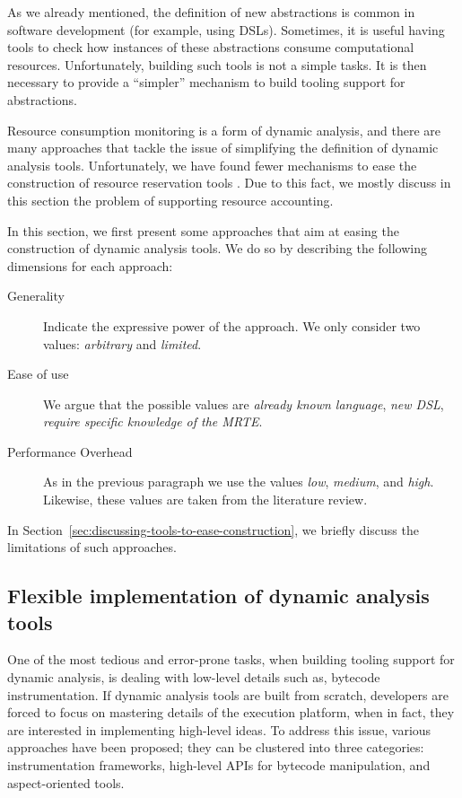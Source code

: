 As we already mentioned, the definition of new abstractions is common in software development (for example, using DSLs).
Sometimes, it is useful having tools to check how instances of these abstractions consume computational resources.
Unfortunately, building such tools is not a simple tasks.
It is then necessary to provide a ``simpler'' mechanism to build tooling support for abstractions.

Resource consumption monitoring is a form of dynamic analysis, and there are many approaches that tackle the issue of simplifying the definition of dynamic analysis tools.
Unfortunately, we have found fewer mechanisms to ease the construction of resource reservation tools \cite{mueller}.
Due to this fact, we mostly discuss in this section the problem of supporting resource accounting. 

In this section, we first present some approaches that aim at easing the construction of dynamic analysis tools.
We do so by describing the following dimensions for each approach:

\begin{description}
\item[Generality] Indicate the expressive power of the approach. We only consider two values: \textit{arbitrary} and \textit{limited}.

\item[Ease of use] We argue that the possible values are \textit{already known language}, \textit{new DSL}, \textit{require specific knowledge of the MRTE}.

\item[Performance Overhead] As in the previous paragraph we use the values \textit{low}, \textit{medium}, and \textit{high}.
Likewise, these values are taken from the literature review.
\end{description}

In Section~\ref{sec:discussing-tools-to-ease-construction}, we briefly discuss the limitations of such approaches.


\subsection{Flexible implementation of dynamic analysis tools}

One of the most tedious and error-prone tasks, when building tooling support for dynamic analysis, is dealing with low-level details such as, bytecode instrumentation.
If dynamic analysis tools are built from scratch, developers are forced to focus on mastering details of the execution platform, when in fact, they are interested in implementing high-level ideas.
To address this issue, various approaches have been proposed; they can be clustered into three categories: instrumentation frameworks, high-level APIs for bytecode manipulation, and aspect-oriented tools.

